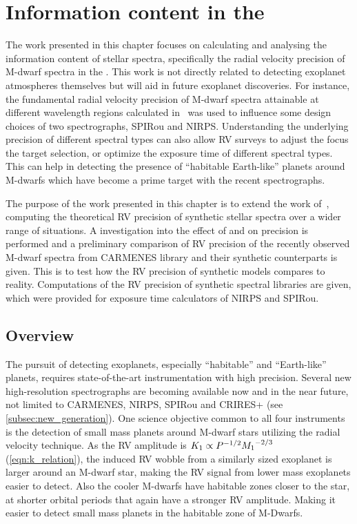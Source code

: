 
\chapter{Information content in the \nir{}}
\label{cha:nir_content}

The work presented in this chapter focuses on calculating and analysing the information content of stellar spectra, specifically the radial velocity precision of M-dwarf spectra in the \nir{}.
This work is not directly related to detecting exoplanet atmospheres themselves but will aid in future exoplanet discoveries.
For instance, the fundamental radial velocity precision of {M-dwarf} spectra attainable at different wavelength regions calculated in~\citet{figueira_radial_2016} was used to influence some design choices of two \nir{} spectrographs, {SPIRou} and {NIRPS}.
Understanding the underlying precision of different spectral types can also allow {RV} surveys to adjust the focus the target selection, or optimize the exposure time of different spectral types.
This can help in detecting the presence of ``habitable Earth-like'' planets around {M-dwarfs} which have become a prime target with the recent \nir{} spectrographs.

The purpose of the work presented in this chapter is to extend the work of~\citet{figueira_radial_2016}, computing the theoretical {RV} precision of synthetic stellar spectra over a wider range of situations.
A investigation into the effect of \Logg{} and \feh{} on precision is performed and a preliminary comparison of {RV} precision of the recently observed \nir{} {M-dwarf} spectra from {CARMENES} library and their synthetic counterparts is given.
This is to test how the {RV} precision of synthetic models compares to reality.
Computations of the {RV} precision of synthetic spectral libraries are given, which were provided for exposure time calculators of {NIRPS} and {SPIRou}.


\section{Overview}
\label{sec:precision_overview}
The pursuit of detecting exoplanets, especially ``habitable'' and ``Earth-like'' planets, requires state-of-the-art instrumentation with high precision.
Several new high-resolution \nir{} spectrographs are becoming available now and in the near future, not limited to {CARMENES}, {NIRPS}, {SPIRou} and {CRIRES+} (see \cref{subsec:new_generation}).
One science objective common to all four instruments is the detection of small mass planets around {M-dwarf} stars utilizing the radial velocity technique.
As the {RV} amplitude is \({K}_{1}\propto {P}^{-{1/2}}{{M}_{1}}^{-2/3}\) (\cref{eqn:k_relation}), the induced {RV} wobble from a similarly sized exoplanet is larger around an M-dwarf star, making the {RV} signal from lower mass exoplanets easier to detect.
Also the cooler {M-dwarfs} have habitable zones closer to the star, at shorter orbital periods that again have a stronger {RV} amplitude.
Making it easier to detect small mass planets in the habitable zone of {M-Dwarfs}.


